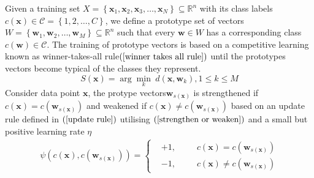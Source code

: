 \documentclass[english]{HSMW-Thesis}
\begin{document}
Given a training set\hspace{2pt} $X=\left\lbrace \mathbf{x}_1,\mathbf{x}_2,\mathbf{x}_3,\ldots,\mathbf{x}_N\right\rbrace \subseteq \mathbb{R}^n$\hspace{2pt} with its class labels\hspace{2pt} $c\left( \mathbf{x}\right)\in\mathcal{C}=\left\lbrace 1,2,\ldots, C\right\rbrace $,\hspace{2pt} we define a prototype set of vectors\hspace{2pt} $W=\left\lbrace \mathbf{w}_1,\mathbf{w}_2,\ldots,\mathbf{w}_M\right\rbrace\subseteq \mathbb{R}^n $\hspace{2pt} such that every\hspace{2pt} $\mathbf{w}\in W$\hspace{2pt} has a corresponding class\hspace{2pt} $c\left( \mathbf{w}\right)\in\mathcal{C} $.\hspace{2pt} The  training of prototype vectors is based on a competitive learning known as winner-takes-all rule$\left( \ref{winner takes all rule}\right)$  until the prototypes vectors become typical of the classes they represent.
\begin{equation}\label{winner takes all rule}
	S\left( \mathbf{x}\right) =\arg\min_k\hspace{3pt} d\left( \mathbf{x},\mathbf{w}_k\right) ,   1\leq k \leq M
\end{equation}
Consider data point\hspace{2pt} $\mathbf{x}$, the protype vectors\hspace{4pt}$\mathbf{w}_{ s\left( \mathbf{x}\right) }$\hspace{2pt} is strengthened if\hspace{2pt} $c\left( \mathbf{x}\right) = c\left( \mathbf{w}_{ s\left( \mathbf{x}\right) }\right) $\hspace{2pt} and weakened if \hspace{2pt}$c\left( \mathbf{x}\right) \neq c\left( \mathbf{w}_{ s\left( \mathbf{x}\right) }\right) $ \hspace{2pt}based on an update rule defined in $\left( \ref{update rule}\right)$ utilising $\left( \ref{strengthen or weaken}\right)$   and  a small but positive learning rate \hspace{2pt}$\eta$
\begin{align}\label{strengthen or weaken}
	\psi \left( c\left( \mathbf{x}\right) , c\left( \mathbf{w}_{ s\left( \mathbf{x} \right) }\right)\right) = 
	\left \{
	\begin{aligned}
		&+1, &&  \hspace{10pt}c\left( \mathbf{x}\right) = c\left( \mathbf{w}_{ s\left( \mathbf{x}\right) }\right) \\
		&-1, &&  \hspace{10pt} c\left( \mathbf{x}\right) \neq c\left( \mathbf{w}_{ s\left( \mathbf{x}\right) }\right)
	\end{aligned} \right.
\end{align}
\end{document}
